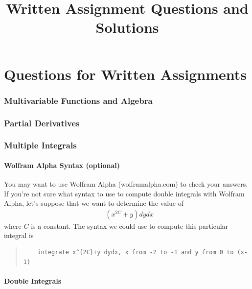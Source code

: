 \documentclass{article}
\title{Written Assignment Questions and Solutions}
\date{}
\begin{document}
\maketitle
\tableofcontents 

\part{Questions for Written Assignments}
\section{Multivariable Functions and Algebra}
\section{Partial Derivatives}
\section{Multiple Integrals}

\subsection*{Wolfram Alpha Syntax (optional)}
You may want to use Wolfram Alpha (wolframalpha.com) to check your answers. If you're not sure what syntax to use to compute double integrals with Wolfram Alpha, let's suppose that we want to determine the value of
\begin{align*} 
   \mathop{\int_{-2}^{-1} \!  \int_0^{x-1}}( x^{2C} +y)  dy  dx
\end{align*}
where $C$ is a constant. The syntax we could use to compute this particular integral is
\begin{quote}
  \begin{verbatim}
    integrate x^{2C}+y dydx, x from -2 to -1 and y from 0 to (x-1)
  \end{verbatim}
\end{quote}
\subsection{Double Integrals}
\end{document}

